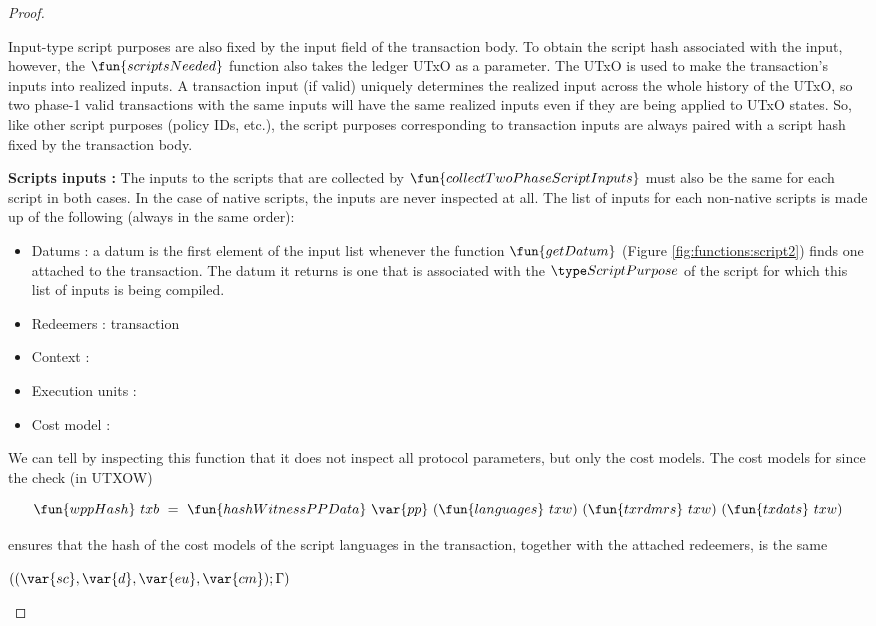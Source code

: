 \begin{property}
\begin{proof}
\begin{itemize}
    Input-type script purposes are also fixed by the input field of the transaction body.
    To obtain the script hash associated with the input, however,
    the $\fun{scriptsNeeded}$ function also takes the ledger UTxO as a parameter.
    The UTxO is used to make the transaction's inputs into realized inputs.
    A transaction input (if valid) uniquely determines the realized input across the whole
    history of the UTxO, so two phase-1 valid transactions with the same inputs
    will have the same realized inputs even if they are being applied to UTxO states.
    So, like other script purposes (policy IDs, etc.), the script purposes corresponding to
    transaction inputs are always paired with a script hash fixed by the transaction body.

    \textbf{Scripts inputs : } The inputs to the scripts that are collected
    by $\fun{collectTwoPhaseScriptInputs}$ must also be the same for each script in both cases.
    In the case of native scripts, the inputs are never inspected at all.
    The list of inputs for each non-native scripts is made up of the following
    (always in the same order):

    \begin{itemize}
      \item Datums : a datum is the first element of the input list whenever
      the function $\fun{getDatum}$ (Figure \ref{fig:functions:script2})
      finds one attached to the transaction. The datum it returns is one that
      is associated with the $\ScriptPurpose$ of the script for which
      this list of inputs is being compiled. 
      \item Redeemers :
      transaction
      \item Context :
      \item Execution units :
      \item Cost model :
    \end{itemize}


    We can tell by inspecting this function that it does not
    inspect all protocol parameters, but only the cost models. The cost models for
    since the check (in UTXOW)

    \[\fun{wppHash}~{txb}~=~\fun{hashWitnessPPData}~\var{pp}~(\fun{languages}~{txw})~(\fun{txrdmrs}~{txw})~(\fun{txdats}~{txw})\]

    ensures that the hash of the cost models of the script languages in the transaction, together
    with the attached redeemers, is the same


    $((\var{sc}, \var{d}, \var{eu}, \var{cm});\Gamma)$
  \end{itemize}
\end{proof}
\end{property}

